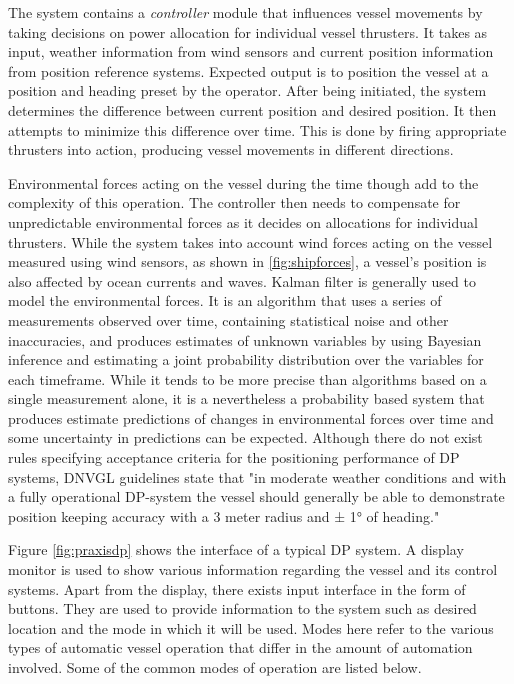 The system contains a \textit{controller} module that influences vessel movements by taking decisions on power allocation for individual vessel thrusters. It takes as input, weather information from wind sensors and current position information from position reference systems. Expected output is to position the vessel at a position and heading preset by the operator. After being initiated, the system determines the difference between current position and desired position. It then attempts to minimize this difference over time. This is done by firing appropriate thrusters into action, producing vessel movements in different directions. 

Environmental forces acting on the vessel during the time though add to the complexity of this operation. The controller then needs to compensate for unpredictable environmental forces as it decides on allocations for individual thrusters.  While the system takes into account wind forces acting on the vessel measured using wind sensors, as shown in \ref{fig:shipforces}, a vessel's position is also affected by ocean currents and waves. Kalman filter is generally used to model the environmental forces. It is an algorithm that uses a series of measurements observed over time, containing statistical noise and other inaccuracies, and produces estimates of unknown variables by using Bayesian inference and estimating a joint probability distribution over the variables for each timeframe. While it tends to be more precise than algorithms based on a single measurement alone, it is a nevertheless a probability based system that produces estimate predictions of changes in environmental forces over time and some uncertainty in predictions can be expected. Although there do not exist rules specifying acceptance criteria for the positioning performance of DP systems, DNVGL guidelines state that "in moderate weather conditions and with a fully operational DP-system the vessel should generally be able to demonstrate position keeping accuracy with a 3 meter radius and ± 1° of heading." \citep{veritas2011dynamic} 


Figure \ref{fig:praxisdp} shows the interface of a typical DP system. A display monitor is used to show various information regarding the vessel and its control systems. Apart from the display, there exists input interface in the form of buttons. They are used to provide information to the system such as desired location and the mode in which it will be used. Modes here refer to the various types of automatic vessel operation that differ in the amount of automation involved. Some of the common modes of operation are listed below. 

